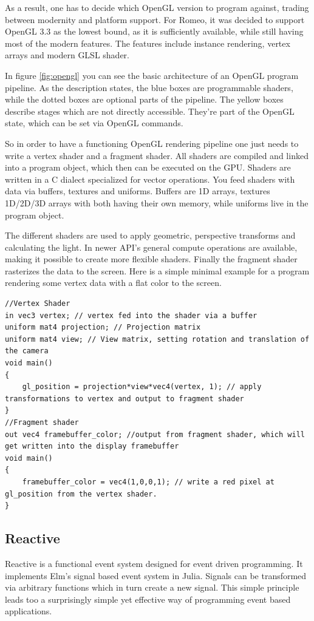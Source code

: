 As a result, one has to decide which \ac{OpenGL} version to program against, trading between modernity and platform support.
For Romeo, it was decided to support \ac{OpenGL} 3.3 as the lowest bound, as it is sufficiently available, while still having most of the modern features.
The features include instance rendering, vertex arrays and modern \ac{GLSL} shader.

In figure \ref{fig:opengl} you can see the basic architecture of an OpenGL program pipeline.
As the description states, the blue boxes are programmable shaders, while the dotted boxes are optional parts of the pipeline.
The yellow boxes describe stages which are not directly accessible. They're part of the OpenGL state, which can be set via OpenGL commands.

So in order to have a functioning OpenGL rendering pipeline one just needs to write a vertex shader and a fragment shader.
All shaders are compiled and linked into a program object, which then can be executed on the \ac{GPU}.
Shaders are written in a C dialect specialized for vector operations. 
You feed shaders with data via buffers, textures and uniforms. Buffers are 1D arrays, textures 1D/2D/3D arrays with both having their own memory, while uniforms live in the program object.

The different shaders are used to apply geometric, perspective transforms and calculating the light.
In newer API's general compute operations are available, making it possible to create more flexible shaders.
Finally the fragment shader rasterizes the data to the screen.
Here is a simple minimal example for a program rendering some vertex data with a flat color to the screen.

\begin{lstlisting}
//Vertex Shader
in vec3 vertex; // vertex fed into the shader via a buffer
uniform mat4 projection; // Projection matrix
uniform mat4 view; // View matrix, setting rotation and translation of the camera
void main()
{
    gl_position = projection*view*vec4(vertex, 1); // apply transformations to vertex and output to fragment shader
}
//Fragment shader
out vec4 framebuffer_color; //output from fragment shader, which will get written into the display framebuffer
void main()
{
    framebuffer_color = vec4(1,0,0,1); // write a red pixel at gl_position from the vertex shader.
}
\end{lstlisting}

\subsection{Reactive}
Reactive is a functional event system designed for event driven programming.
It implements Elm's signal based event system in Julia.
Signals can be transformed via arbitrary functions which in turn create a new signal.
This simple principle leads too a surprisingly simple yet effective way of programming event based applications.

